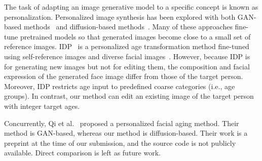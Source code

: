 The task of adapting an image generative model to a specific concept is known as personalization.
Personalized image synthesis has been explored with
both GAN-based methods~\cite{roich2022pivotal,nitzan2022mystyle,qi2024my3dgen,zeng2023mystyle++} and diffusion-based methods~\cite{gal2022textual,ruiz2022dreambooth,kumari2023multi}.
Many of these approaches fine-tune pretrained models so that generated images become close to a small set of reference images.
IDP~\cite{banerjee2023identity} is a personalized age transformation method fine-tuned using self-reference images and diverse facial images~\cite{jiang2021talk}. 
However, because IDP is for generating new images but not for editing them, the composition and facial expression of the generated face image differ from those of the target person. Moreover, IDP restricts age input to predefined coarse categories (i.e., age groups). In contrast, our method can edit an existing image of the target person with integer target ages.

Concurrently, Qi et al.~\cite{DBLP:journals/corr/abs-2411-14521} proposed a personalized facial aging method. Their method is GAN-based, whereas our method is diffusion-based. Their work is a preprint at the time of our submission, and the source code is not publicly available. Direct comparison is left as future work. 